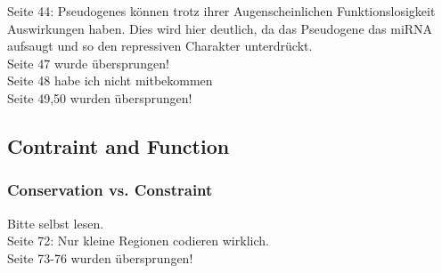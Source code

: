 \documentclass{article}
\begin{document}
Seite 44: Pseudogenes können trotz ihrer Augenscheinlichen Funktionslosigkeit Auswirkungen haben. Dies
wird hier deutlich, da das Pseudogene das miRNA aufsaugt und so den repressiven Charakter unterdrückt.\\

Seite 47 wurde übersprungen!\\

Seite 48 habe ich nicht mitbekommen\\

Seite 49,50 wurden übersprungen! \\

\subsection{Contraint and Function}
\subsubsection{Conservation vs. Constraint}
Bitte selbst lesen.\\

Seite 72: Nur kleine Regionen codieren wirklich.\\

Seite 73-76 wurden übersprungen!\\
\end{document}
